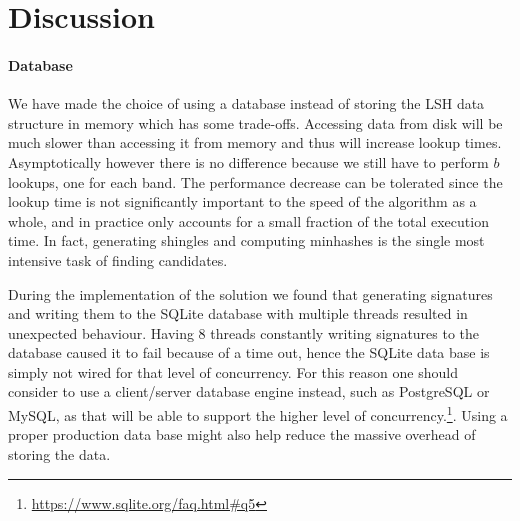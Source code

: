 \section{Discussion}




\paragraph{Database}
We have made the choice of using a database instead of storing the LSH data structure in memory which has some trade-offs. Accessing data from disk will be much slower than accessing it from memory and thus will increase lookup times. Asymptotically however there is no difference because we still have to perform $b$ lookups, one for each band. The performance decrease can be tolerated since the lookup time is not significantly important to the speed of the algorithm as a whole, and in practice only accounts for a small fraction of the total execution time. In fact, generating shingles and computing minhashes is the single most intensive task of finding candidates.

During the implementation of the solution we found that generating signatures and writing them to the SQLite database with multiple threads resulted in unexpected behaviour. Having 8 threads constantly writing signatures to the database caused it to fail because of a time out, hence the SQLite data base is simply not wired for that level of concurrency. For this reason one should consider to use a client/server database engine instead, such as PostgreSQL or MySQL, as that will be able to support the higher level of concurrency.\footnote{\url{https://www.sqlite.org/faq.html\#q5}}. Using a proper production data base might also help reduce the massive overhead of storing the data.

